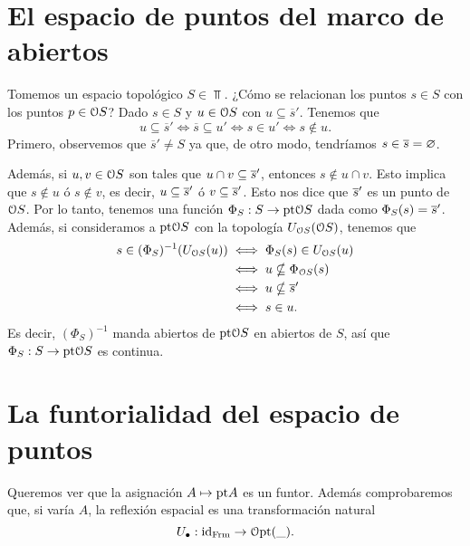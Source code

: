 \section{El espacio de puntos del marco de abiertos}
Tomemos un espacio topológico $S\in\Top$.
¿Cómo se relacionan los puntos $s\in S$ con los puntos $p\in\cal OS$?
Dado $s\in S$ y $u\in\cal OS$ con $u\subseteq \overline{s}'$. Tenemos que
\[u\subseteq \overline{s}' \iff \overline{s}\subseteq u' \iff s\in u' \iff s\notin u.\]
Primero, observemos que $\overline{s}'\neq S$ ya que, de otro modo,
tendríamos $s\in\ol{s}=\emptyset$.\par 
Además, si $u,v\in \cal OS$ son tales que
$u\cap v\subseteq \ol{s}'$, entonces $s\notin u\cap v$.
Esto implica que $s\notin u$ ó $s\notin v$, es decir, $u\subseteq \ol{s}'$ ó $v\subseteq \ol{s}'$.
Esto nos dice que $\ol{s}'$ es un punto de $\cal OS$.
Por lo tanto, tenemos una función $\Phi_S:S\to\pt\cal OS$ dada
como $\Phi_S(s) = \ol{s}'$.
Además, si consideramos a $\pt\cal OS$ con la topología
$U_{\cal OS}(\cal OS)$, tenemos que
\begin{align*}
    s\in (\Phi_S)^{-1}(U_{\cal OS}(u))
    &\iff \Phi_S(s) \in U_{\cal OS}(u) \\
    &\iff u \nsubseteq \Phi_{\cal OS}(s) \\
    &\iff u \nsubseteq \ol{s}' \\
    &\iff s\in u.
\end{align*}
Es decir, $(\Phi_S)^{-1}$ manda abiertos de $\pt\cal OS$ en abiertos
de $S$, así que $\Phi_S:S\to\pt\cal OS$ es continua.

\section{La funtorialidad del espacio de puntos}
Queremos ver que la asignación $A\mapsto \pt A$ es un funtor.
Además comprobaremos que, si varía $A$, la reflexión espacial
es una transformación natural
\[U_\bullet:\id_{\Frm}\to\cal O\pt(\_).\]


